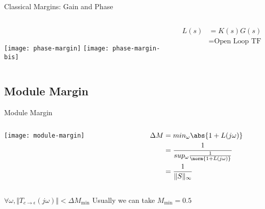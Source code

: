 \documentclass[../main/main.tex]{subfiles}
\begin{document}
\begin{frame}{Classical Margins: Gain and Phase}
  \begin{columns}
    \begin{column}{0.6\textwidth}
      \\\vspace{1em}
      \begin{overprint}
        \texttt{[image: phase-margin]}
        \texttt{[image: phase-margin-bis]}
      \end{overprint}
    \end{column}
    \begin{column}{0.4\textwidth}
      \begin{align*}
        L(s) & = K(s) G(s)\\
             & = \text{Open Loop TF}
      \end{align*}

    \end{column}
  \end{columns}
\end{frame}

\subsection{Module Margin}

\begin{frame}{Module Margin}
  \begin{columns}
    \begin{column}{0.5\textwidth}
      \texttt{[image: module-margin]}
    \end{column}
    \begin{column}{0.5\textwidth}
      \begin{align*}
        \Delta M & = min_{\omega}\abs{1+L(j\omega)}\\
                 & = \frac{1}{sup_\omega\frac{1}{\norm{1+L(j\omega)}}}\\
                 & = \frac{1}{\hnorm{S}}
      \end{align*}
    \end{column}
  \end{columns}
  \begin{tcolorbox}[size=small, top=4pt, colback=red!5!white,colframe=red!75!black,title=If we want to have a good module margin]
    $\forall \omega, \Vert T_{c\rightarrow\epsilon}(j\omega)\Vert < \Delta M_{\text{min}}$ Usually we can take $M_{\text{min}} = 0.5$
  \end{tcolorbox}
\end{frame}
\end{document}

